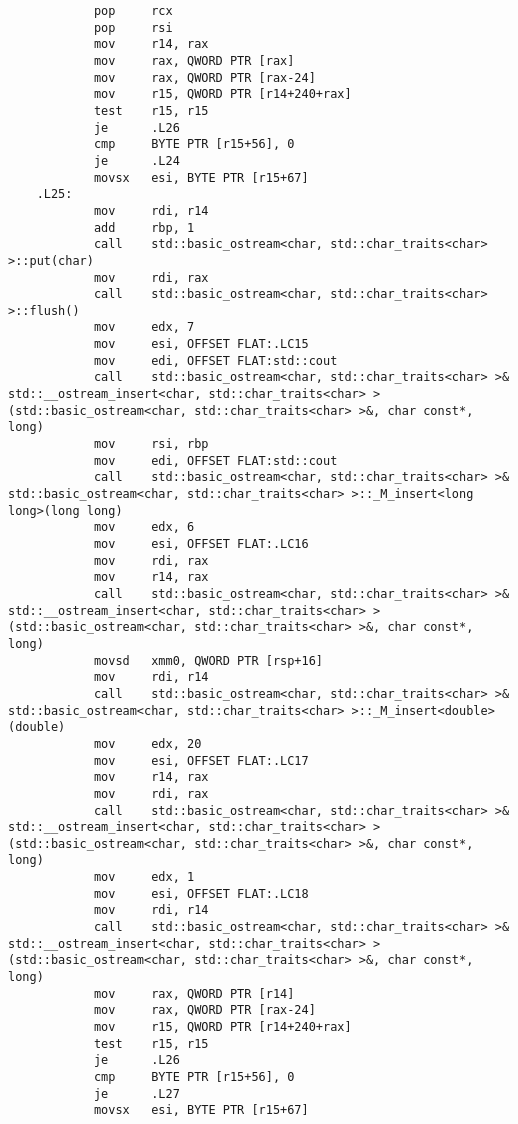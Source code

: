 \documentclass[12pt,a4paper]{article}
\numberwithin{subsection}{section}
\begin{document}
\begin{lstlisting}
            pop     rcx
            pop     rsi
            mov     r14, rax
            mov     rax, QWORD PTR [rax]
            mov     rax, QWORD PTR [rax-24]
            mov     r15, QWORD PTR [r14+240+rax]
            test    r15, r15
            je      .L26
            cmp     BYTE PTR [r15+56], 0
            je      .L24
            movsx   esi, BYTE PTR [r15+67]
    .L25:
            mov     rdi, r14
            add     rbp, 1
            call    std::basic_ostream<char, std::char_traits<char> >::put(char)
            mov     rdi, rax
            call    std::basic_ostream<char, std::char_traits<char> >::flush()
            mov     edx, 7
            mov     esi, OFFSET FLAT:.LC15
            mov     edi, OFFSET FLAT:std::cout
            call    std::basic_ostream<char, std::char_traits<char> >& std::__ostream_insert<char, std::char_traits<char> >(std::basic_ostream<char, std::char_traits<char> >&, char const*, long)
            mov     rsi, rbp
            mov     edi, OFFSET FLAT:std::cout
            call    std::basic_ostream<char, std::char_traits<char> >& std::basic_ostream<char, std::char_traits<char> >::_M_insert<long long>(long long)
            mov     edx, 6
            mov     esi, OFFSET FLAT:.LC16
            mov     rdi, rax
            mov     r14, rax
            call    std::basic_ostream<char, std::char_traits<char> >& std::__ostream_insert<char, std::char_traits<char> >(std::basic_ostream<char, std::char_traits<char> >&, char const*, long)
            movsd   xmm0, QWORD PTR [rsp+16]
            mov     rdi, r14
            call    std::basic_ostream<char, std::char_traits<char> >& std::basic_ostream<char, std::char_traits<char> >::_M_insert<double>(double)
            mov     edx, 20
            mov     esi, OFFSET FLAT:.LC17
            mov     r14, rax
            mov     rdi, rax
            call    std::basic_ostream<char, std::char_traits<char> >& std::__ostream_insert<char, std::char_traits<char> >(std::basic_ostream<char, std::char_traits<char> >&, char const*, long)
            mov     edx, 1
            mov     esi, OFFSET FLAT:.LC18
            mov     rdi, r14
            call    std::basic_ostream<char, std::char_traits<char> >& std::__ostream_insert<char, std::char_traits<char> >(std::basic_ostream<char, std::char_traits<char> >&, char const*, long)
            mov     rax, QWORD PTR [r14]
            mov     rax, QWORD PTR [rax-24]
            mov     r15, QWORD PTR [r14+240+rax]
            test    r15, r15
            je      .L26
            cmp     BYTE PTR [r15+56], 0
            je      .L27
            movsx   esi, BYTE PTR [r15+67]

\end{lstlisting}
\end{document}
